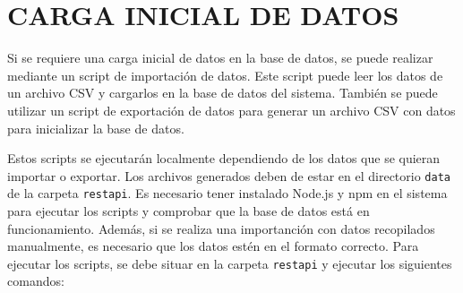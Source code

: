 \newpage
\section{CARGA INICIAL DE DATOS}
Si se requiere una carga inicial de datos en la base de datos, se puede realizar mediante un script de importación de datos.
Este script puede leer los datos de un archivo CSV y cargarlos en la base de datos del sistema.
También se puede utilizar un script de exportación de datos para generar un archivo CSV con datos para inicializar la base de datos.

Estos scripts se ejecutarán localmente dependiendo de los datos que se quieran importar o exportar.
Los archivos generados deben de estar en el directorio \texttt{data} de la carpeta \texttt{restapi}.
Es necesario tener instalado Node.js y npm en el sistema para ejecutar los scripts y comprobar que la base de datos está en funcionamiento.
Además, si se realiza una importanción con datos recopilados manualmente, es necesario que los datos estén en el formato correcto.
Para ejecutar los scripts, se debe situar en la carpeta \texttt{restapi} y ejecutar los siguientes comandos:
